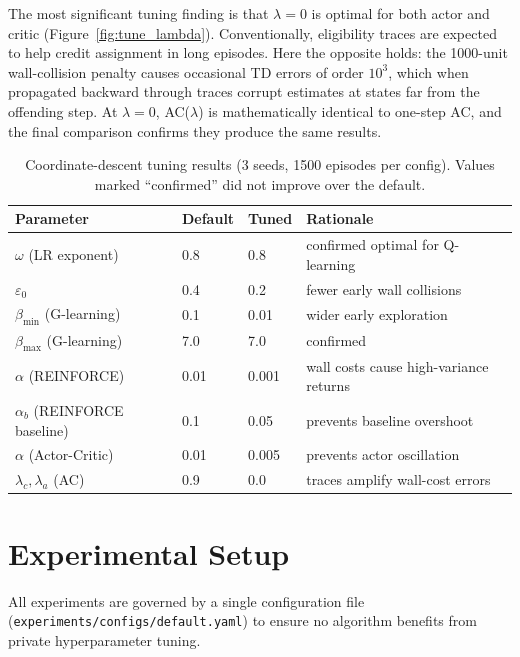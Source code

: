 \documentclass[11pt]{article}
\begin{document}
The most significant tuning finding is that $\lambda=0$ is optimal for both
actor and critic (Figure~\ref{fig:tune_lambda}).  Conventionally, eligibility
traces are expected to help credit assignment in long episodes.  Here the
opposite holds: the 1000-unit wall-collision penalty causes occasional TD errors
of order $10^3$, which when propagated backward through traces corrupt estimates
at states far from the offending step.  At $\lambda=0$, AC($\lambda$) is
mathematically identical to one-step AC, and the final comparison confirms they
produce the same results.

\begin{table}[H]
\centering
\caption{Coordinate-descent tuning results (3 seeds, 1500 episodes per config).
Values marked ``confirmed'' did not improve over the default.}
\label{tab:tuning}
\begin{tabular}{lllp{5.5cm}}
\toprule
Parameter & Default & Tuned & Rationale \\
\midrule
$\omega$ (LR exponent)              & 0.8  & 0.8   & confirmed optimal for Q-learning \\
$\varepsilon_0$                     & 0.4  & 0.2   & fewer early wall collisions \\
$\beta_{\min}$ (G-learning)         & 0.1  & 0.01  & wider early exploration \\
$\beta_{\max}$ (G-learning)         & 7.0  & 7.0   & confirmed \\
$\alpha$ (REINFORCE)                & 0.01 & 0.001 & wall costs cause high-variance returns \\
$\alpha_b$ (REINFORCE baseline)     & 0.1  & 0.05  & prevents baseline overshoot \\
$\alpha$ (Actor-Critic)             & 0.01 & 0.005 & prevents actor oscillation \\
$\lambda_c, \lambda_a$ (AC)         & 0.9  & 0.0   & traces amplify wall-cost errors \\
\bottomrule
\end{tabular}
\end{table}

\section{Experimental Setup}

All experiments are governed by a single configuration file
(\texttt{experiments/configs/default.yaml}) to ensure no algorithm benefits
from private hyperparameter tuning.
\end{document}

